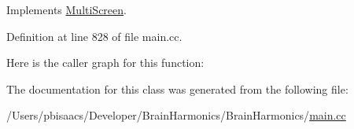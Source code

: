 Implements \hyperlink{class_multi_screen_a76ec369d025ed4dafdf81fdf5100937b}{Multi\+Screen}.



Definition at line 828 of file main.\+cc.



Here is the caller graph for this function\+:




The documentation for this class was generated from the following file\+:\begin{DoxyCompactItemize}
\item 
/\+Users/pbisaacs/\+Developer/\+Brain\+Harmonics/\+Brain\+Harmonics/\hyperlink{main_8cc}{main.\+cc}\end{DoxyCompactItemize}
